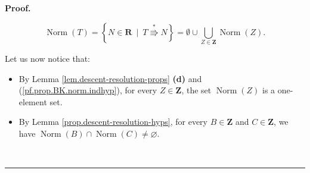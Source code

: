 \documentclass[numbers=enddot,12pt,final,onecolumn,notitlepage]{scrartcl}%
\theoremstyle{definition}
\newenvironment{proof}[1][Proof]{\noindent\textbf{#1.} }{\ \rule{0.5em}{0.5em}}
\begin{document}
\begin{proof}
\begin{comment}
\end{comment}

\begin{equation} 
\operatorname*{Norm}\left(  T\right)  =\left\{  N\in\mathbf{R}\ \mid\ T\overset{\ast}{\Rrightarrow}N\right\} 
 =\emptyset\cup\bigcup_{Z\in\mathbf{Z}}\operatorname*{Norm}\left(  Z\right)  .\label{pf.prop.BK.norm.union}%
\end{equation}


Let us now notice that:

\begin{itemize}
\item By Lemma \ref{lem.descent-resolution-props} \textbf{(d)} and
(\ref{pf.prop.BK.norm.indhyp}), for every $Z\in\mathbf{Z}$, the set
$\operatorname*{Norm}\left( Z\right)  $ is a one-element set.

\item By Lemma \ref{prop.descent-resolution-hyps}, for every
$B\in\mathbf{Z}$ and $C\in\mathbf{Z}$, we have
$\operatorname*{Norm}\left(  B\right)  \cap\operatorname*{Norm}\left(
C\right)  \neq\varnothing$.
\begin{comment}
 
\ \ \ \ \footnote{In more detail:
\par
Let $B\in\mathbf{Z}$ and $C\in\mathbf{Z}$. Then,
$T\Rrightarrow B$ (since $B\in\mathbf{Z}$), so that
$\ell\left(  T\right)  >\ell\left(  B\right)  $ (by
Lemma \ref{lem.descent-resolution-props} \textbf{(d)}).
Similarly, $T\Rrightarrow C$ and
$\ell\left(  T\right)  >\ell\left(  C\right)  $.
Hence, Lemma \ref{prop.descent-resolution-hyps} (applied to $A=T$)
yields that there exists
a $D\in\mathbf{S}$ such that $B\overset{\ast}{\Rrightarrow}D$ and
$C\overset{\ast}{\Rrightarrow}D$. Consider this $D$. Lemma
\ref{lem.descent-resolution-*props} \textbf{(d)} (applied to $P=B$ and $Q=D$)
yields $\ell\left(  B\right)  \geq\ell\left(  D\right)  $. Thus, $\ell\left(
T\right)  >\ell\left(  B\right)  \geq\ell\left(  D\right)  $. Hence,
$\operatorname*{Norm}\left(  D\right)  $ is a one-element set (by
(\ref{pf.prop.BK.norm.indhyp}), applied to $S=D$).
\par
But $B\overset{\ast}{\Rrightarrow}D$. Thus, every $N\in\mathbf{R}$ satisfying
$D\overset{\ast}{\Rrightarrow}N$ also satisfies $B\overset{\ast}{\Rrightarrow
}N$ (since the relation $\overset{\ast}{\Rrightarrow}$ is transitive). In
other words, every element of $\operatorname*{Norm}\left(  D\right)  $ is also
an element of $\operatorname*{Norm}\left(  B\right)  $. In other words,
$\operatorname*{Norm}\left(  D\right)  \subseteq\operatorname*{Norm}\left(
B\right)  $. Similarly, $\operatorname*{Norm}\left(  D\right)  \subseteq
\operatorname*{Norm}\left(  C\right)  $. Hence, $\operatorname*{Norm}\left(
D\right)  \subseteq\operatorname*{Norm}\left(  B\right)  \cap
\operatorname*{Norm}\left(  C\right)  $. Hence, $\operatorname*{Norm}\left(
B\right)  \cap\operatorname*{Norm}\left(  C\right)  \neq\varnothing$ (since
$\operatorname*{Norm}\left(  D\right)  $ is a one-element set), qed.


\end{comment}
\end{itemize}
\end{proof}
\end{document}
